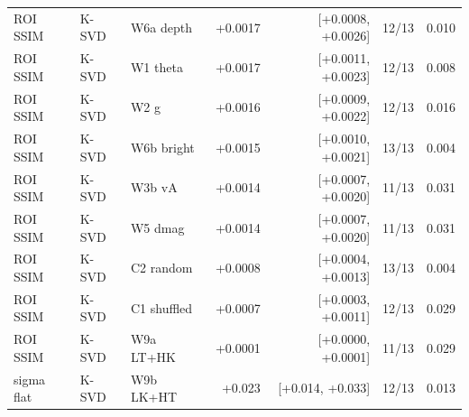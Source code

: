 \begin{tabular}{lllrrrr}
ROI SSIM & K-SVD & W6a depth & +0.0017 & [+0.0008, +0.0026] & 12/13 & 0.010 \\
ROI SSIM & K-SVD & W1 theta & +0.0017 & [+0.0011, +0.0023] & 12/13 & 0.008 \\
ROI SSIM & K-SVD & W2 g & +0.0016 & [+0.0009, +0.0022] & 12/13 & 0.016 \\
ROI SSIM & K-SVD & W6b bright & +0.0015 & [+0.0010, +0.0021] & 13/13 & 0.004 \\
ROI SSIM & K-SVD & W3b vA & +0.0014 & [+0.0007, +0.0020] & 11/13 & 0.031 \\
ROI SSIM & K-SVD & W5 dmag & +0.0014 & [+0.0007, +0.0020] & 11/13 & 0.031 \\
ROI SSIM & K-SVD & C2 random & +0.0008 & [+0.0004, +0.0013] & 13/13 & 0.004 \\
ROI SSIM & K-SVD & C1 shuffled & +0.0007 & [+0.0003, +0.0011] & 12/13 & 0.029 \\
ROI SSIM & K-SVD & W9a LT+HK & +0.0001 & [+0.0000, +0.0001] & 11/13 & 0.029 \\
sigma flat & K-SVD & W9b LK+HT & +0.023 & [+0.014, +0.033] & 12/13 & 0.013 \\
\bottomrule
\end{tabular}
